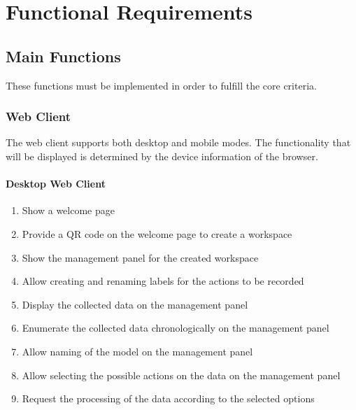 \section{Functional Requirements}

\subsection{Main Functions}
These functions must be implemented in order to fulfill the core criteria.

\subsubsection{Web Client}
The web client supports both desktop and mobile modes. The functionality that will be displayed is determined by the device information of the browser.

\paragraph{Desktop Web Client}

\def\twodigits#1{%
  \ifnum#1<10 0\fi
  \number#1}

\begin{enumerate}[{label = \textbf{/F{\protect\twodigits{\arabic{enumi}}}0/}, leftmargin = *}]
    \item Show a welcome page
    \item Provide a QR code on the welcome page to create a \gls{workspace}
    \item Show the management panel for the created workspace
    \item Allow creating and renaming labels for the actions to be recorded
    \item Display the collected data on the management panel
    \item Enumerate the collected data chronologically on the management panel %
    \item Allow naming of the model on the management panel
    \item Allow selecting the possible actions on the data on the management panel %
    \item Request the processing of the data according to the selected options
\end{enumerate}


